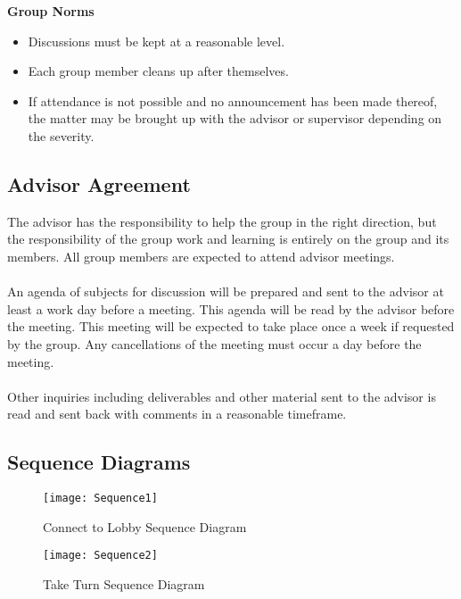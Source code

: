 \textbf{Group Norms}
\begin{itemize}
	\item Discussions must be kept at a reasonable level.
	\item Each group member cleans up after themselves.
	\item If attendance is not possible and no announcement has been made thereof, the matter may be brought up with the advisor or supervisor depending on the severity.
\end{itemize}
\newpage
\subsection{Advisor Agreement}
The advisor has the responsibility to help the group in the right direction, but the responsibility of the group work and learning is entirely on the group and its members. All group members are expected to attend advisor meetings.
\\
\\
An agenda of subjects for discussion will be prepared and sent to the advisor at least a work day before a meeting. This agenda will be read by the advisor before the meeting. This meeting will be expected to take place once a week if requested by the group. Any cancellations of the meeting must occur a day before the meeting.
\\
\\
Other inquiries including deliverables and other material sent to the advisor is read and sent back with comments in a reasonable timeframe.

\subsection{Sequence Diagrams}
\label{appendix:sequence_diagrams}
\begin{figure}[h]
\centerline{\texttt{[image: Sequence1]} }
\caption{Connect to Lobby Sequence Diagram}
\end{figure}
\newpage
\begin{figure}[h]
\centerline{\texttt{[image: Sequence2]} }
\caption{Take Turn Sequence Diagram}
\end{figure}
